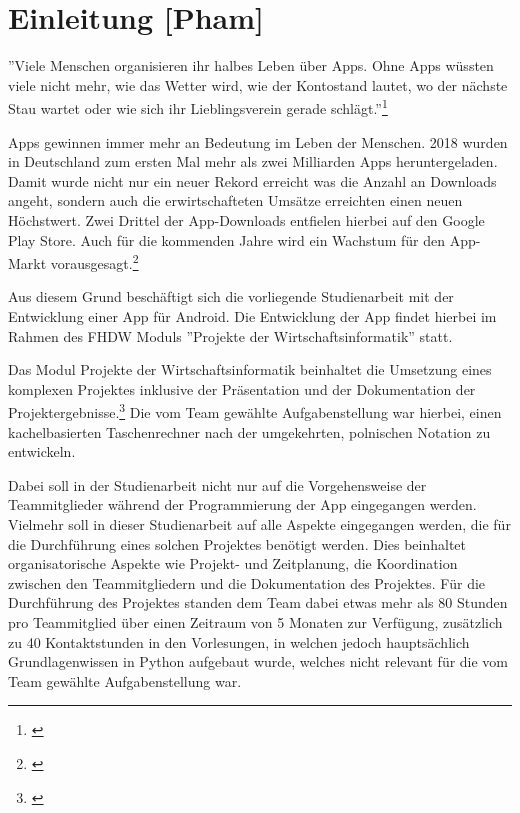 
\section{Einleitung [Pham]}

''Viele Menschen organisieren ihr halbes Leben über Apps. Ohne Apps wüssten viele nicht mehr, wie das Wetter wird, wie der Kontostand lautet, wo der nächste Stau wartet oder wie sich ihr Lieblingsverein gerade schlägt.''\footnote{\cite[Berg, zitiert nach][]{rondinella2019}}

Apps gewinnen immer mehr an Bedeutung im Leben der Menschen. 2018 wurden in Deutschland zum ersten Mal mehr als zwei Milliarden Apps heruntergeladen. Damit wurde nicht nur ein neuer Rekord erreicht was die Anzahl an Downloads angeht, sondern auch die erwirtschafteten Umsätze erreichten einen neuen Höchstwert. Zwei Drittel der App-Downloads entfielen hierbei auf den Google Play Store. Auch für die kommenden Jahre wird ein Wachstum für den App-Markt vorausgesagt.\footnote{\cite[vgl.][]{rondinella2019}}

Aus diesem Grund beschäftigt sich die vorliegende Studienarbeit mit der Entwicklung einer App für Android. Die Entwicklung der App findet hierbei im Rahmen des FHDW Moduls ''Projekte der Wirtschaftsinformatik'' statt.

Das Modul Projekte der Wirtschaftsinformatik beinhaltet die Umsetzung eines komplexen Projektes inklusive der Präsentation und der Dokumentation der Projektergebnisse.\footnote{\cite[vgl.][]{fhdw2020}}  Die vom Team gewählte Aufgabenstellung war hierbei, einen kachelbasierten Taschenrechner nach der umgekehrten, polnischen Notation zu entwickeln. 

Dabei soll in der Studienarbeit nicht nur auf die Vorgehensweise der Teammitglieder während der Programmierung der App eingegangen werden. Vielmehr soll in dieser Studienarbeit auf alle Aspekte eingegangen werden, die für die Durchführung eines solchen Projektes benötigt werden. Dies beinhaltet organisatorische Aspekte wie Projekt- und Zeitplanung, die Koordination zwischen den Teammitgliedern und die Dokumentation des Projektes. Für die Durchführung des Projektes standen dem Team dabei etwas mehr als 80 Stunden pro Teammitglied über einen Zeitraum von 5 Monaten zur Verfügung, zusätzlich zu 40 Kontaktstunden in den Vorlesungen, in welchen jedoch hauptsächlich Grundlagenwissen in Python aufgebaut wurde, welches nicht relevant für die vom Team gewählte Aufgabenstellung war. 